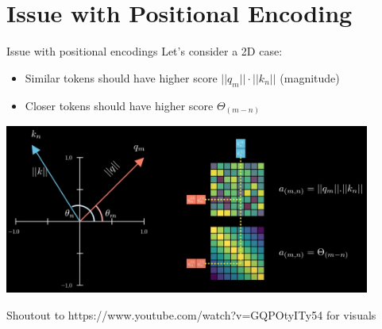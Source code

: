\documentclass{beamer}
\begin{document}
\section{Issue with Positional Encoding}
\begin{frame}[t]{Issue with positional encodings}
    Let's consider a 2D case:
    \begin{itemize}[label=-]
        \item Similar tokens should have higher score $||q_m|| \cdot ||k_n||$ (magnitude) 
        \item Closer tokens should have higher score $\Theta_{(m-n)}$
    \end{itemize}
    \begin{center}
        \includegraphics[width=0.9\textwidth]{./img/rope_1.png}
    \end{center}
    \small Shoutout to https://www.youtube.com/watch?v=GQPOtyITy54 for visuals
    \normalsize
\end{frame}
\end{document}
